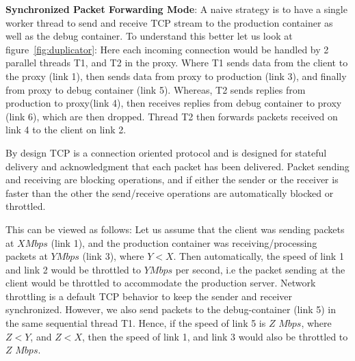 

\textbf{Synchronized Packet Forwarding Mode}: 
A naive strategy is to have a single worker thread to send and receive TCP stream to the production container as well as the debug container.
To understand this better let us look at figure~\ref{fig:duplicator}: Here each incoming connection would be handled by 2 parallel threads T1, and T2 in the proxy. 
Where T1 sends data from the client to the proxy (link 1), then sends data from proxy to production (link 3), and finally from proxy to debug container (link 5). 
Whereas, T2 sends replies from production to proxy(link 4), then receives replies from debug container to proxy (link 6), which are then dropped. 
Thread T2 then forwards packets received on link 4 to the client on link 2.

By design TCP is a connection oriented protocol and is designed for stateful delivery and acknowledgment that each packet has been delivered.
Packet sending and receiving are blocking operations, and if either the sender or the receiver is faster than the other the send/receive operations are automatically blocked or throttled.

This can be viewed as follows: Let us assume that the client was sending packets at $X Mbps$ (link 1), and the production container was receiving/processing packets at $Y Mbps$ (link 3), where $Y<X$. 
Then automatically, the speed of link 1 and link 2 would be throttled to $Y Mbps$ per second, i.e the packet sending at the client would be throttled to accommodate the production server. 
Network throttling is a default TCP behavior to keep the sender and receiver synchronized.
However, we also send packets to the debug-container (link 5) in the same sequential thread T1. 
Hence, if the speed of link 5 is $Z$ $Mbps$, where $Z < Y$, and $Z < X$, then the speed of link 1, and link 3 would also be throttled to $Z$ $Mbps$.

